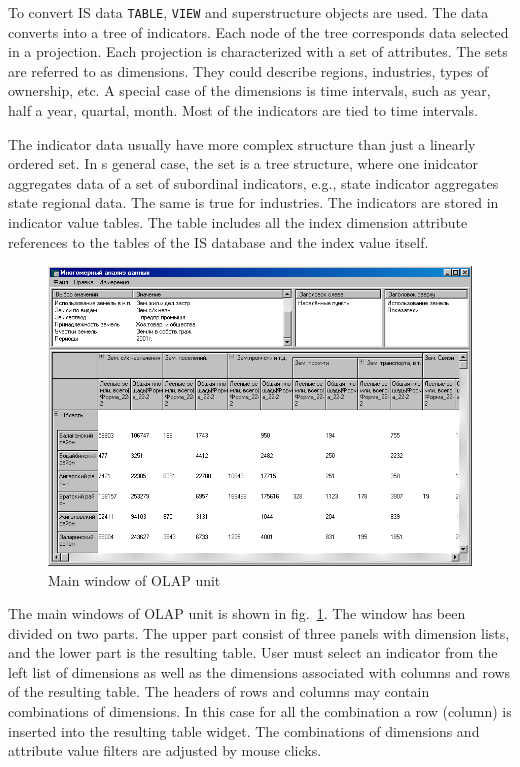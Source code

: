 \documentclass[conference]{IEEEtran}
\begin{document}
To convert IS data \texttt{TABLE}, \texttt{VIEW} and superstructure objects are used.  The data converts into a tree of indicators.  Each node of the tree corresponds data selected in a projection.  Each projection is characterized with a set of attributes.  The sets are referred to as dimensions.  They could describe regions, industries, types of ownership, etc.  A special case of the dimensions is time intervals, such as year, half a year, quartal, month.  Most of the indicators are tied to time intervals.

The indicator data usually have more complex structure than just a linearly ordered set.  In s general case, the set is a tree structure, where one inidcator aggregates data of a set of subordinal indicators, e.g., state indicator aggregates state regional data.  The same is true for industries.  The indicators are stored in indicator value tables.  The table includes all the index dimension attribute references to the tables of the IS database and the index value itself.

\begin{figure}[bt]
  \centering
  \includegraphics[width=\linewidth]{MDA-olap.png}
  \caption{Main window of OLAP unit}
  \label{fig:olapu}
\end{figure}

The main windows of OLAP unit is shown in fig.~\ref{fig:olapu}.  The window has been divided on two parts.  The upper part consist of three panels with dimension lists, and the lower part is the resulting table.  User must select an indicator from the left list of dimensions as well as the dimensions associated with columns and rows of the resulting table.  The headers of rows and columns may contain combinations of dimensions.  In this case for all the combination a row (column) is inserted into the resulting table widget.  The combinations of dimensions and attribute value filters are adjusted by mouse clicks.
\end{document}
